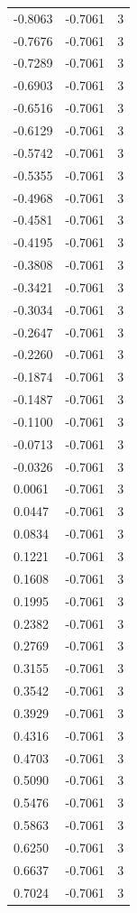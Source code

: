 \begin{longtable}{lrr}
  -0.8063 & -0.7061 & 3 \\
  -0.7676 & -0.7061 & 3 \\
  -0.7289 & -0.7061 & 3 \\
  -0.6903 & -0.7061 & 3 \\
  -0.6516 & -0.7061 & 3 \\
  -0.6129 & -0.7061 & 3 \\
  -0.5742 & -0.7061 & 3 \\
  -0.5355 & -0.7061 & 3 \\
  -0.4968 & -0.7061 & 3 \\
  -0.4581 & -0.7061 & 3 \\
  -0.4195 & -0.7061 & 3 \\
  -0.3808 & -0.7061 & 3 \\
  -0.3421 & -0.7061 & 3 \\
  -0.3034 & -0.7061 & 3 \\
  -0.2647 & -0.7061 & 3 \\
  -0.2260 & -0.7061 & 3 \\
  -0.1874 & -0.7061 & 3 \\
  -0.1487 & -0.7061 & 3 \\
  -0.1100 & -0.7061 & 3 \\
  -0.0713 & -0.7061 & 3 \\
  -0.0326 & -0.7061 & 3 \\
  0.0061 & -0.7061 & 3 \\
  0.0447 & -0.7061 & 3 \\
  0.0834 & -0.7061 & 3 \\
  0.1221 & -0.7061 & 3 \\
  0.1608 & -0.7061 & 3 \\
  0.1995 & -0.7061 & 3 \\
  0.2382 & -0.7061 & 3 \\
  0.2769 & -0.7061 & 3 \\
  0.3155 & -0.7061 & 3 \\
  0.3542 & -0.7061 & 3 \\
  0.3929 & -0.7061 & 3 \\
  0.4316 & -0.7061 & 3 \\
  0.4703 & -0.7061 & 3 \\
  0.5090 & -0.7061 & 3 \\
  0.5476 & -0.7061 & 3 \\
  0.5863 & -0.7061 & 3 \\
  0.6250 & -0.7061 & 3 \\
  0.6637 & -0.7061 & 3 \\
  0.7024 & -0.7061 & 3 \\

\end{longtable}

